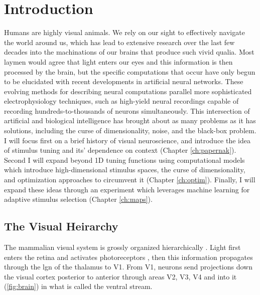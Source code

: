 
\chapter{\color{thesisBlue} Introduction} %

\label{ch:intro} %
\glsresetall



Humans are highly visual animals. We rely on our sight to effectively navigate the world around us, which has lead to extensive research over the last few decades into the machinations of our brains that produce such vivid qualia. Most laymen would agree that light enters our eyes and this information is then processed by the brain, but the specific computations that occur have only begun to be elucidated with recent developments in artificial neural networks. These evolving methods for describing neural computations parallel more sophisticated electrophysiology techniques, such as high-yield neural recordings capable of recording hundreds-to-thousands of neurons simultaneously. This intersection of artificial and biological intelligence has brought about as many problems as it has solutions, including the curse of dimensionality, noise, and the black-box problem. I will focus first on a brief history of visual neuroscience, and introduce the idea of stimulus tuning and its' dependence on context (Chapter \ref{ch:papernak}). Second I will expand beyond 1D tuning functions using computational models which introduce high-dimensional stimulus spaces, the curse of dimensionality, and optimization approaches to circumvent it (Chapter \ref{ch:optim}). Finally, I will expand these ideas through an experiment which leverages machine learning for adaptive stimulus selection (Chapter \ref{ch:maps}).

\section{The Visual Heirarchy}
The mammalian visual system is grossly organized hierarchically \citep{Felleman1991, Barone2000, Batardiere2002}. Light first enters the retina and activates photoreceptors \citep{Field2010}, then this information propagates through the \gls{lgn} of the thalamus to V1. From V1, neurons send projections down the visual cortex posterior to anterior through areas V2, V3, V4 and into \gls{it} (\ref{fig:brain}) in what is called the ventral stream. 

